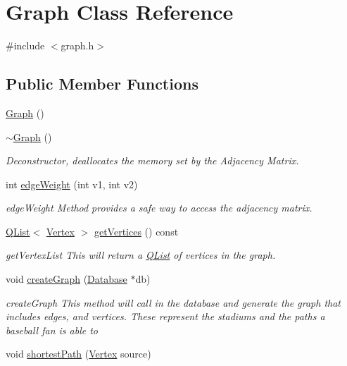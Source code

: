 \hypertarget{class_graph}{}\section{Graph Class Reference}
\label{class_graph}


{\ttfamily \#include $<$graph.\+h$>$}

\subsection*{Public Member Functions}
\begin{DoxyCompactItemize}
\item 
\hyperlink{class_graph_ae4c72b8ac4d693c49800a4c7e273654f}{Graph} ()
\item 
\hyperlink{class_graph_a902c5b3eacb66d60752525ab23297a95}{$\sim$\+Graph} ()
\begin{DoxyCompactList}\small\item\em Deconstructor, deallocates the memory set by the Adjacency Matrix. \end{DoxyCompactList}\item 
int \hyperlink{class_graph_ae4cc9fd62a6dbe9e42ee0de8128b8b86}{edge\+Weight} (int v1, int v2)
\begin{DoxyCompactList}\small\item\em edge\+Weight Method provides a safe way to access the adjacency matrix. \end{DoxyCompactList}\item 
\hyperlink{class_q_list}{Q\+List}$<$ \hyperlink{class_vertex}{Vertex} $>$ \hyperlink{class_graph_aacba6816dff17b52d3636f3448953ed3}{get\+Vertices} () const 
\begin{DoxyCompactList}\small\item\em get\+Vertex\+List This will return a \hyperlink{class_q_list}{Q\+List} of vertices in the graph. \end{DoxyCompactList}\item 
void \hyperlink{class_graph_aac58209df6c10a710770a641b86faf79}{create\+Graph} (\hyperlink{class_database}{Database} $\ast$db)
\begin{DoxyCompactList}\small\item\em create\+Graph This method will call in the database and generate the graph that includes edges, and vertices. These represent the stadiums and the paths a baseball fan is able to \end{DoxyCompactList}\item 
void \hyperlink{class_graph_a3eb1eaf4a580710194c014d0e135c7b6}{shortest\+Path} (\hyperlink{class_vertex}{Vertex} source)

\end{DoxyCompactItemize}
